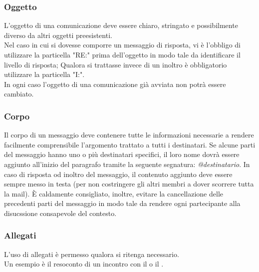     \subsubsection{Oggetto}
      L'oggetto di una comunicazione deve essere chiaro, stringato e possibilmente diverso da altri oggetti preesistenti.\\
      Nel caso in cui si dovesse comporre un messaggio di risposta, vi è l'obbligo di utilizzare la particella "RE:" prima dell'oggetto in modo tale da identificare
      il livello di risposta; Qualora si trattasse invece di un inoltro è obbligatorio utilizzare la particella "I:".\\
      In ogni caso l'oggetto di una comunicazione già avviata non potrà essere cambiato.
    \subsubsection{Corpo}
      Il corpo di un messaggio deve contenere tutte le informazioni necessarie a rendere facilmente comprensibile l’argomento trattato a tutti i destinatari. Se alcune parti del messaggio hanno uno o più destinatari specifici, il loro nome dovrà essere aggiunto all’inizio del paragrafo tramite la seguente segnatura: \emph{@destinatario}.
      In caso di risposta od inoltro del messaggio, il contenuto aggiunto deve essere sempre messo in testa (per non costringere gli altri membri a dover scorrere tutta la mail).
      È caldamente consigliato, inoltre, evitare la cancellazione delle precedenti parti del messaggio in modo tale da rendere ogni partecipante alla disucssione consapevole del contesto.
    \subsubsection{Allegati}
      L'uso di allegati è permesso qualora si ritenga necessario.\\
      Un esempio è il resoconto di un incontro con il  o il .

